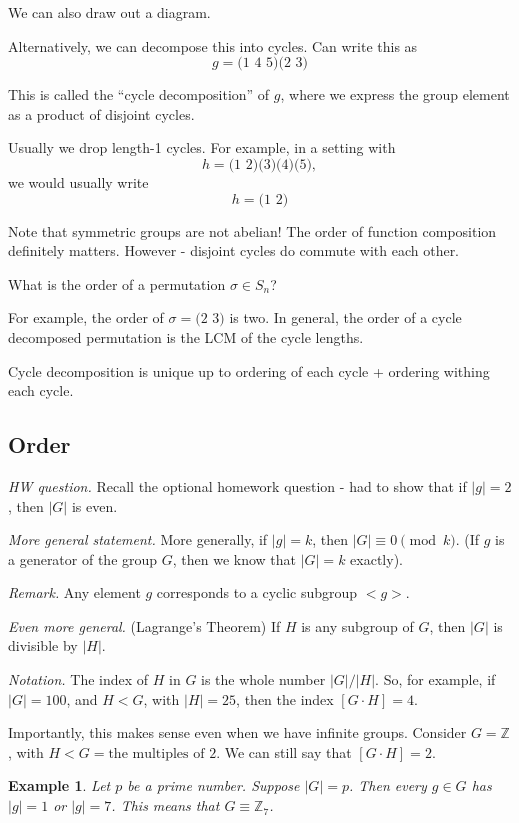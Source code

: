 \documentclass[12pt]{article}
\newtheorem*{example}{Example}
\def\ZZ{\mathbb{Z}}
\begin{document}
We can also draw out a diagram.

Alternatively, we can decompose this into cycles.  Can write this as
\[
  g = \text{(1 4 5)(2 3)}
\]

This is called the ``cycle decomposition'' of $g$, where we express the group element as a product of disjoint cycles.

Usually we drop length-1 cycles.  For example, in a setting with
\[
  h = \text{(1 2)(3)(4)(5)},
\]
we would usually write
\[
  h = \text{(1 2)}
\]

Note that symmetric groups are not abelian!  The order of function composition definitely matters.  However - disjoint cycles do commute with each other.

What is the order of a permutation $\sigma \in S_n$?

For example, the order of $\sigma = \text{(2 3)}$ is two.  In general, the order of a cycle decomposed permutation is the LCM of the cycle lengths.

Cycle decomposition is unique up to ordering of each cycle + ordering withing each cycle.

\subsection{Order}

{\it HW question.} Recall the optional homework question - had to show that if $|g| = 2$, then $|G|$ is even.

{\it More general statement.} More generally, if $|g| = k$, then $|G| \equiv 0 \pmod{k}$.  (If $g$ is a generator of the group $G$, then we know that $|G| = k$ exactly).

{\it Remark.} Any element $g$ corresponds to a cyclic subgroup $<g>$.

{\it Even more general.} (Lagrange's Theorem) If $H$ is any subgroup of $G$, then $|G|$ is divisible by $|H|$.

{\it Notation.} The index of $H$ in $G$ is the whole number $|G| / |H|$. So, for example, if $|G| = 100$, and $H < G$, with $|H| = 25$, then the index $[G \cdot H] = 4$.

Importantly, this makes sense even when we have infinite groups.  Consider $G = \ZZ$, with $H < G = \text{the multiples of $2$}$.  We can still say that $[G \cdot H] = 2$. \\

\begin{example}
  Let $p$ be a prime number.  Suppose $|G| = p$.  Then every $g \in G$ has $|g| = 1$ or $|g| = 7$.  This means that $G \equiv \ZZ_7$.
\end{example}
\end{document}
